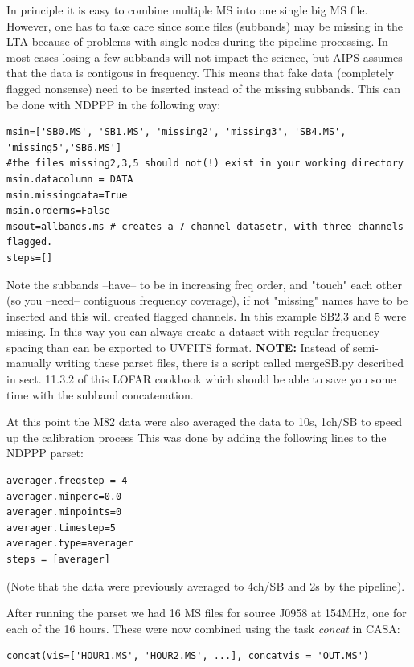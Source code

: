In principle it is easy to combine multiple MS into one single big MS file.
However, one has to take care since some files (subbands) may be missing in the LTA
because of problems with single nodes during the pipeline processing. In most
cases losing a few subbands will not impact the science, but AIPS assumes that the data
is contigous in frequency. This means that fake data (completely flagged nonsense) 
need to be inserted instead of the missing subbands. This can be done with NDPPP
in the following way:
\begin{lstlisting}
msin=['SB0.MS', 'SB1.MS', 'missing2', 'missing3', 'SB4.MS', 'missing5','SB6.MS']
#the files missing2,3,5 should not(!) exist in your working directory
msin.datacolumn = DATA
msin.missingdata=True
msin.orderms=False
msout=allbands.ms # creates a 7 channel datasetr, with three channels flagged.
steps=[]
\end{lstlisting}
Note the subbands --have-- to be in increasing freq order, and "touch" each
other (so you --need-- contiguous frequency coverage), if not "missing" names
have to be inserted and this will created flagged channels. In this example
SB2,3 and 5 were missing. In this way you can always create a dataset with
regular frequency spacing than can be exported to UVFITS format.
{\bf NOTE:} Instead of semi-manually writing these parset files, there is a script called mergeSB.py
described in sect. 11.3.2 of this LOFAR cookbook which should be able to save you some
time with the subband concatenation.

At this point the M82 data were also averaged the data to 10s, 1ch/SB to speed up the calibration process
This was done by adding the following lines to the NDPPP parset:
\begin{lstlisting}
averager.freqstep = 4
averager.minperc=0.0
averager.minpoints=0
averager.timestep=5
averager.type=averager
steps = [averager]
\end{lstlisting}
(Note that the data were previously averaged to 4ch/SB and 2s by the pipeline).

After running the parset we had 16 MS files for source J0958 at 154MHz, one for each of the 16 hours. These were now combined 
using the task \emph{concat} in CASA:
\begin{lstlisting}
concat(vis=['HOUR1.MS', 'HOUR2.MS', ...], concatvis = 'OUT.MS')
\end{lstlisting}

